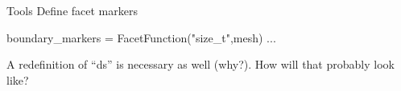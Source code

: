 \begin{frame}[shrink=20,fragile]
\begin{columns}[c]
\begin{column}{0.5\textwidth}
\begin{center}
      \end{center}
    \end{column}
  \end{columns}
  \begin{block}{Tools}
    Define facet markers
    \vspace{-1em}
    \begin{python}
boundary_markers = FacetFunction("size_t",mesh)
...
    \end{python}
    A redefinition of ``ds'' is necessary as well (why?). How will that probably look
    like? 
\end{block}
\end{frame}
